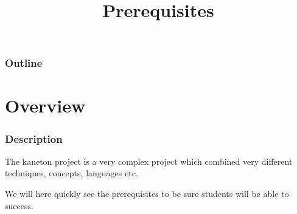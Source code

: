 %
%
%
%
%
%

%
%

%
%

\def\path{../..}

%
%



%
%

\title{Prerequisites}

%
%



%
%

\begin{frame}
  \titlepage
\end{frame}

%
%

\begin{frame}
  \frametitle{Outline}

  \tableofcontents
\end{frame}

%
%

\section{Overview}


\begin{frame}
  \frametitle{Description}

  The kaneton project is a very complex project which combined very different
  techniques, concepts, languages etc.

  \-

  We will here quickly see the prerequisites to be sure students will be
  able to success.
\end{frame}


